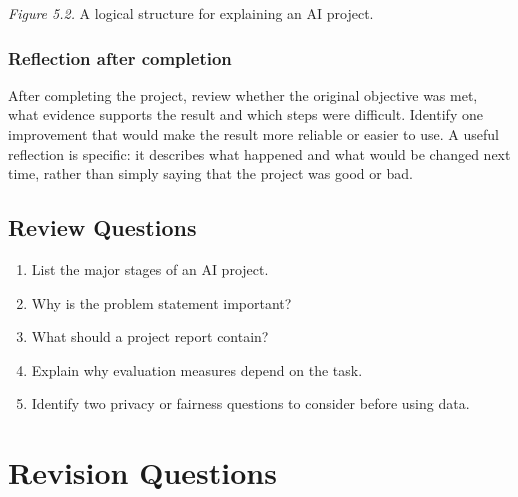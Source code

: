 \documentclass[11pt,openany,oneside]{book}
\begin{document}
\begin{center}
\end{center}
\textit{Figure 5.2.} A logical structure for explaining an AI project.

\subsection{Reflection after completion}
After completing the project, review whether the original objective was met, what evidence supports the result and which steps were difficult. Identify one improvement that would make the result more reliable or easier to use. A useful reflection is specific: it describes what happened and what would be changed next time, rather than simply saying that the project was good or bad.

\section*{Review Questions}
\begin{enumerate}
\item List the major stages of an AI project.
\item Why is the problem statement important?
\item What should a project report contain?
\item Explain why evaluation measures depend on the task.
\item Identify two privacy or fairness questions to consider before using data.
\end{enumerate}

\chapter*{Revision Questions}
\end{document}
